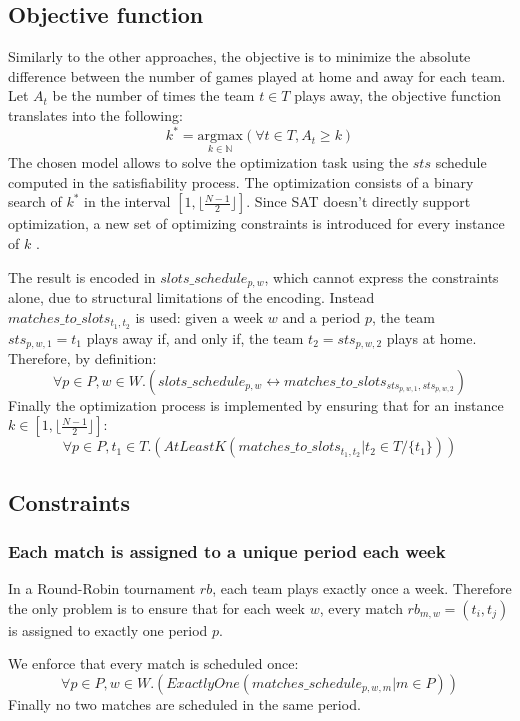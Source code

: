 \subsection{Objective function}
Similarly to the other approaches, the objective is to minimize the absolute difference between the number of games played at home and away for each team.
Let $A_t$ be the number of times the team $t \in T$ plays away, the objective function translates into the following:
$$
k^* = \underset{k \in \mathbb{N}}{\text{argmax}} \left( \forall t \in T, A_t \geq k \right)
$$
The chosen model allows to solve the optimization task using the $sts$ schedule computed in the satisfiability process. The optimization consists of a binary search of $k^*$ in the interval $[1, \lfloor\frac{N-1}{2}\rfloor]$. Since SAT doesn't directly support optimization, a new set of optimizing constraints is introduced for every instance of $k$ .

The result is encoded in $slots\_schedule_{p, w}$, which cannot express the constraints alone, due to structural limitations of the encoding.
Instead \\$matches\_to\_slots_{t_1, t_2}$ is used: given a week $w$ and a period $p$, the team $sts_{p, w, 1} = t_1$ plays away if, and only if, the team $t_2 = sts_{p, w, 2}$ plays at home. Therefore, by definition:
$$
    \forall p \in P, w \in W.(slots\_schedule_{p, w} \leftrightarrow matches\_to\_slots_{sts_{p, w, 1}, sts_{p, w, 2}})
$$
Finally the optimization process is implemented by ensuring that for an instance $k \in [1, \lfloor\frac{N-1}{2}\rfloor]$:
$$
    \forall p \in P, t_1 \in T.(AtLeastK(matches\_to\_slots_{t_1, t_2} | t_2 \in T/\{t_1\}))
$$

\subsection{Constraints}
\subsubsection{Each match is assigned to a unique period each week}
In a Round-Robin tournament $rb$, each team plays exactly once a week. 
Therefore the only problem is to ensure that for each week $w$, every match $rb_{m, w} = (t_i, t_j)$ is assigned to exactly one period $p$.

We enforce that every match is scheduled once:
$$
    \forall p \in P, w \in W.(ExactlyOne(matches\_schedule_{p, w, m} | m \in P))
$$
Finally no two matches are scheduled in the same period. 

